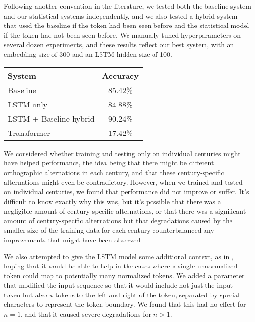 \documentclass[11pt,a4paper]{article}
\begin{document}
Following another convention in the literature, we tested both the baseline system and our statistical systems independently, and we also tested a hybrid system that used the baseline if the token had been seen before and the statistical model if the token had not been seen before. We manually tuned hyperparameters on several dozen experiments, and these results reflect our best system, with an embedding size of 300 and an LSTM hidden size of 100.

\begin{center}
\begin{tabular}{|l|c|}\hline
System & Accuracy \\\hline
Baseline & 85.42\% \\\hline
LSTM only & 84.88\% \\\hline
LSTM + Baseline hybrid & 90.24\% \\\hline
Transformer & 17.42\% \\\hline
\end{tabular}
\end{center}

We considered whether training and testing only on individual centuries might have helped performance, the idea being that there might be different orthographic alternations in each century, and that these century-specific alternations might even be contradictory. However, when we trained and tested on individual centuries, we found that performance did not improve or suffer. It’s difficult to know exactly why this was, but it’s possible that there was a negligible amount of century-specific alternations, or that there was a significant amount of century-specific alternations but that degradations caused by the smaller size of the training data for each century counterbalanced any improvements that might have been observed.

We also attempted to give the LSTM model some additional context, as in \cite{jurish_more_2010}, hoping that it would be able to help in the cases where a single unnormalized token could map to potentially many normalized tokens. We added a parameter that modified the input sequence so that it would include not just the input token but also $n$ tokens to the left and right of the token, separated by special characters to represent the token boundary. We found that this had no effect for $n=1$, and that it caused severe degradations for $n>1$. 
\end{document}
